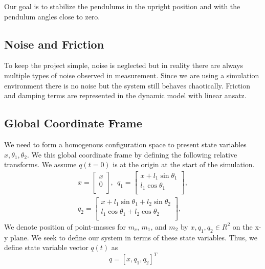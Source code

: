 \documentclass[journal]{IEEEtran}
\begin{document}
Our goal is to stabilize the pendulums in the upright position and with the
pendulum angles close to zero.

\subsection{Noise and Friction}
To keep the project simple, noise is neglected but in reality there are always
multiple types of noise observed in measurement. Since we are using a simulation
environment there is no noise but the system still behaves chaotically. Friction
and damping terms are represented in the dynamic model with linear ansatz.

\subsection{Global Coordinate Frame}
We need to form a homogenous configuration space to present state variables
\(x, \theta_1, \theta_2\). We this global coordinate frame by defining the
following relative transforms. We assume \(q(t=0)\) is at the origin at the start
of the simulation.
\begin{equation}
    \begin{split}
    x = \begin{bmatrix}
    x \\
    0 \\
    \end{bmatrix}, ~~
    q_1 = \begin{bmatrix}
    x + l_1 \sin \theta_1 \\
    l_1 \cos \theta_1 \\
    \end{bmatrix}, \\
    q_2 = \begin{bmatrix}
    x + l_1 \sin \theta_1 + l_2 \sin \theta_2 \\
    l_1 \cos \theta_1 + l_2 \cos \theta_2 \\
\end{bmatrix},
\end{split}
\end{equation}
\noindent
We denote position of point-masses for \(m_c\), \(m_1\), and
\(m_2\) by \(x, q_1, q_2 \in R^2\) on the x-y plane.
We seek to define our system in terms of these state variables. Thus, we define
state variable vector \(q(t)\) as
\begin{equation}
q = [x, q_1, q_2]^{T}
\end{equation}
\end{document}
